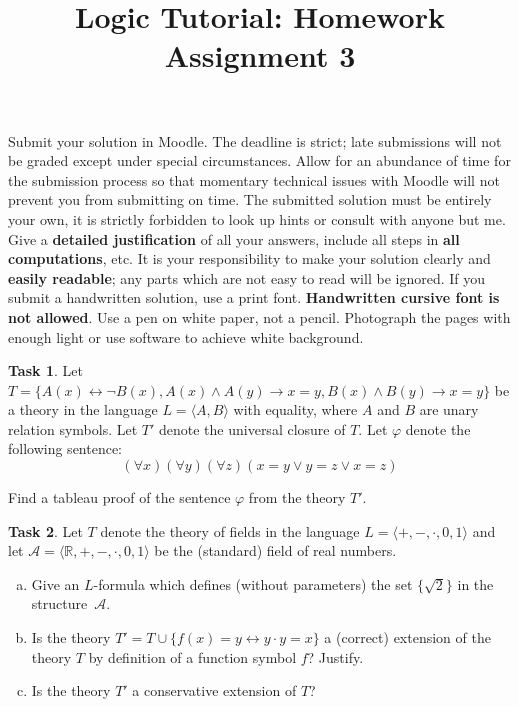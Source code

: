 \documentclass[a4paper]{amsart}
\title{\sc Logic Tutorial: Homework Assignment 3}
\theoremstyle{definition}
\newtheorem{task}{Task}
\begin{document}
\maketitle

\thispagestyle{empty}

Submit your solution in Moodle. The deadline is strict; late submissions will not be graded except under special circumstances. Allow for an abundance of time for the submission process so that momentary technical issues with Moodle will not prevent you from submitting on time. The submitted solution must be entirely your own, it is strictly forbidden to look up hints or consult with anyone but me. Give a \textbf{detailed justification} of all your answers, include all steps in \textbf{all computations}, etc. It is your responsibility to make your solution clearly and \textbf{easily readable}; any parts which are not easy to read will be ignored. If you submit a handwritten solution, use a print font. \textbf{Handwritten cursive font is not allowed}. Use a pen on white paper, not a pencil. Photograph the pages with enough light or use software to achieve white background.

\medskip
\begin{task}
Let $T=\{A(x)\leftrightarrow \neg B(x),A(x)\wedge A(y)\to x=y,B(x)\wedge B(y)\to x=y\}$ be a theory in the language $L=\langle A,B\rangle$ with equality, where $A$ and $B$ are unary relation symbols. Let $T'$ denote the universal closure of $T$. Let $\varphi$ denote the following sentence:
$$
(\forall x)(\forall y)(\forall z)(x=y\vee y=z\vee x=z)
$$

Find a tableau proof of the sentence $\varphi$ from the theory $T'$.
\end{task}


\medskip\begin{task}
Let $T$ denote the theory of fields in the language $L=\langle +,-,\cdot,0,1 \rangle$ and let  $\mathcal{A}=\langle\mathbb{R},+,-,\cdot,0,1 \rangle$ be the (standard) field of real numbers.
\begin{enumerate}[(a)]
\item Give an $L$-formula which defines (without parameters) the set $\{\sqrt{2}\}$ in the structure~$\mathcal{A}$.
\item Is the theory $T'=T \cup \{f(x)=y \leftrightarrow y\cdot y=x\}$ a (correct) extension of the theory $T$ by definition of a function symbol $f$? Justify.
\item Is the theory $T'$ a conservative extension of $T$?
\end{enumerate}
\end{task}
\end{document}
